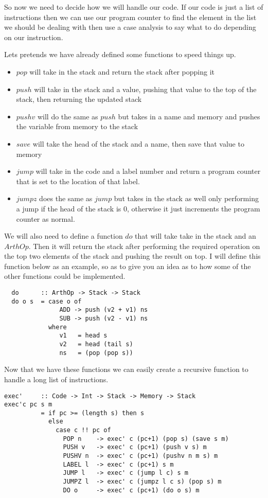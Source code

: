 So now we need to decide how we will handle our code. If our code is just a list of instructions then we can use our program counter to find the element in the list we should be dealing with then use a case analysis to say what to do depending on our instruction.

Lets pretends we have already defined some functions to speed things up. 
\begin{itemize}
\item $pop$ will take in the stack and return the stack after popping it
\item $push$ will take in the stack and a value, pushing that value to the top of the stack, then returning the updated stack
\item $pushv$ will do the same as $push$ but takes in a name and memory and pushes the variable from memory to the stack
\item $save$ will take the head of the stack and a name, then save that value to memory
\item $jump$ will take in the code and a label number and return a program counter that is set to the location of that label.
\item $jumpz$ does the same as $jump$ but takes in the stack as well only performing a jump if the head of the stack is 0, otherwise it just increments the program counter as normal.
\end{itemize}

 
We will also need to define a function $do$ that will take take in the stack and an $ArthOp$. Then it will return the stack after performing the required operation on the top two elements of the stack and pushing the result on top. I will define this function below as an example, so as to give you an idea as to how some of the other functions could be implemented.

\begin{lstlisting}
  do      :: ArthOp -> Stack -> Stack
  do o s  = case o of
               ADD -> push (v2 + v1) ns 
               SUB -> push (v2 - v1) ns
            where 
               v1   = head s
               v2   = head (tail s)
               ns   = (pop (pop s)) 
\end{lstlisting}

\newpage

Now that we have these functions we can easily create a recursive function to handle a long list of instructions. 

\begin{lstlisting}[basicstyle=\ttfamily\small]
exec'     :: Code -> Int -> Stack -> Memory -> Stack
exec'c pc s m 
          = if pc >= (length s) then s 
            else 
              case c !! pc of
                POP n    -> exec' c (pc+1) (pop s) (save s m)
                PUSH v   -> exec' c (pc+1) (push v s) m
                PUSHV n  -> exec' c (pc+1) (pushv n m s) m
                LABEL l  -> exec' c (pc+1) s m
                JUMP l   -> exec' c (jump l c) s m
                JUMPZ l  -> exec' c (jumpz l c s) (pop s) m
                DO o     -> exec' c (pc+1) (do o s) m               
\end{lstlisting}

